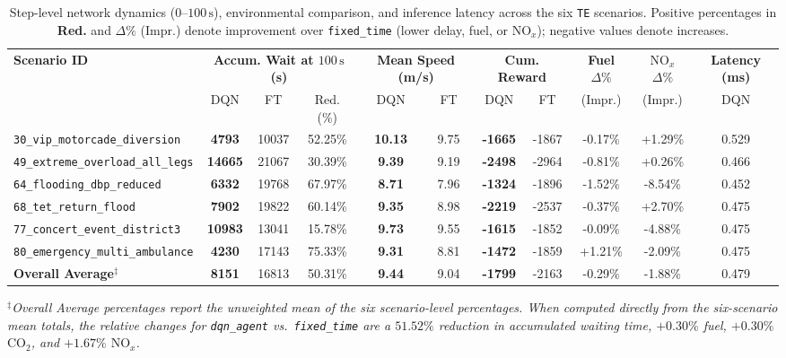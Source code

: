 \begin{table}[t]
\caption{Step-level network dynamics ($0\text{--}100\,\mathrm{s}$), environmental comparison, and inference latency across the six \texttt{TE} scenarios. Positive percentages in \textbf{Red.} and $\Delta\%$ (Impr.) denote improvement over \texttt{fixed\_time} (lower delay, fuel, or $\mathrm{NO}_x$); negative values denote increases.}
\label{tab:te_step_and_env}
\centering
\scriptsize
\begin{tabular}{lcccccccccc}
\toprule
\textbf{Scenario ID} & \multicolumn{3}{c}{\textbf{Accum. Wait at $100\,\mathrm{s}$ (s)}} & \multicolumn{2}{c}{\textbf{Mean Speed (m/s)}} & \multicolumn{2}{c}{\textbf{Cum. Reward}} & \textbf{Fuel $\Delta\%$} & \textbf{$\mathrm{NO}_x$ $\Delta\%$} & \textbf{Latency (ms)} \\
\cmidrule(lr){2-4}\cmidrule(lr){5-6}\cmidrule(lr){7-8}\cmidrule(lr){9-9}\cmidrule(lr){10-10}\cmidrule(lr){11-11}
 & DQN & FT & Red. (\%) & DQN & FT & DQN & FT & (Impr.) & (Impr.) & DQN \\
\midrule
\texttt{30\_vip\_motorcade\_diversion}  & \textbf{4793}  & 10037 & 52.25\% & \textbf{10.13} & 9.75 & \textbf{-1665} & -1867 & -0.17\% & +1.29\% & 0.529 \\
\texttt{49\_extreme\_overload\_all\_legs}& \textbf{14665} & 21067 & 30.39\% & \textbf{9.39}  & 9.19 & \textbf{-2498} & -2964 & -0.81\% & +0.26\% & 0.466 \\
\texttt{64\_flooding\_dbp\_reduced}     & \textbf{6332}  & 19768 & 67.97\% & \textbf{8.71}  & 7.96 & \textbf{-1324} & -1896 & -1.52\% & -8.54\% & 0.452 \\
\texttt{68\_tet\_return\_flood}         & \textbf{7902}  & 19822 & 60.14\% & \textbf{9.35}  & 8.98 & \textbf{-2219} & -2537 & -0.37\% & +2.70\% & 0.475 \\
\texttt{77\_concert\_event\_district3}  & \textbf{10983} & 13041 & 15.78\% & \textbf{9.73}  & 9.55 & \textbf{-1615} & -1852 & -0.09\% & -4.88\% & 0.475 \\
\texttt{80\_emergency\_multi\_ambulance}& \textbf{4230}  & 17143 & 75.33\% & \textbf{9.31}  & 8.81 & \textbf{-1472} & -1859 & +1.21\% & -2.09\% & 0.475 \\
\midrule
\textbf{Overall Average}$^\ddagger$       & \textbf{8151}  & 16813 & 50.31\% & \textbf{9.44}  & 9.04 & \textbf{-1799} & -2163 & -0.29\% & -1.88\% & 0.479 \\
\bottomrule
\end{tabular}
\begin{minipage}{\textwidth}
\vspace{2pt}
\footnotesize
\textit{$^\ddagger$Overall Average percentages report the unweighted mean of the six scenario-level percentages. When computed directly from the six-scenario mean totals, the relative changes for \texttt{dqn\_agent} vs.\ \texttt{fixed\_time} are a $51.52\%$ reduction in accumulated waiting time, $+0.30\%$ fuel, $+0.30\%$ $\mathrm{CO}_2$, and $+1.67\%$ $\mathrm{NO}_x$.}
\end{minipage}
\end{table}

